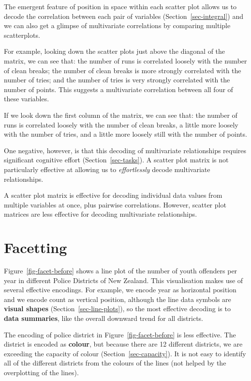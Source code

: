 \documentclass[
  letterpaper,
  DIV=11,
  numbers=noendperiod]{scrreprt}
\begin{document}
The emergent feature of position in space within each scatter plot
allows us to decode the correlation between each pair of variables
(Section~\ref{sec-integral}) and we can also get a glimpse of
multivariate correlations by comparing multiple scatterplots.

For example, looking down the scatter plots just above the diagonal of
the matrix, we can see that: the number of runs is correlated loosely
with the number of clean breaks; the number of clean breaks is more
strongly correlated with the number of tries; and the number of tries is
very strongly correlated with the number of points. This suggests a
multivariate correlation between all four of these variables.

If we look down the first column of the matrix, we can see that: the
number of runs is correlated loosely with the number of clean breaks, a
little more loosely with the number of tries, and a little more loosely
still with the number of points.

One negative, however, is that this decoding of multivariate
relationships requires significant cognitive effort
(Section~\ref{sec-tasks}). A scatter plot matrix is not particularly
effective at allowing us to \emph{effortlessly} decode multivariate
relationships.

A scatter plot matrix is effective for decoding individual data values
from multiple variables at once, plus pairwise correlations. However,
scatter plot matrices are less effective for decoding multivariate
relationships.

\section{Facetting}\label{sec-facetting}

Figure~\ref{fig-facet-before} shows a line plot of the number of youth
offenders per year in different Police Districts of New Zealand. This
visualisation makes use of several effective encodings. For example, we
encode year as horizontal position and we encode count as vertical
position, although the line data symbols are \textbf{visual shapes}
(Section~\ref{sec-line-plots}), so the most effective decoding is to
\textbf{data summaries}, like the overall downward trend for all
districts.

The encoding of police district in Figure~\ref{fig-facet-before} is less
effective. The district is encoded as \textbf{colour}, but because there
are 12 different districts, we are exceeding the capacity of colour
(Section~\ref{sec-capacity}). It is not easy to identify all of the
different districts from the colours of the lines (not helped by the
overplotting of the lines).
\end{document}
